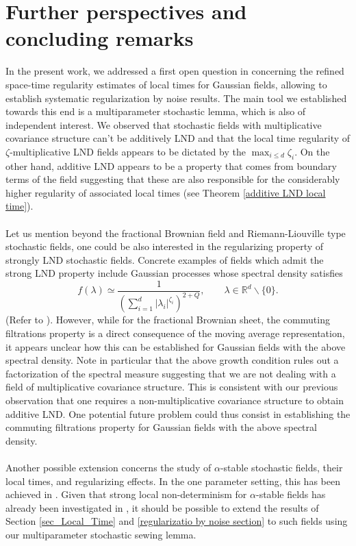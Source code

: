 \documentclass[11pt,oneside,english,reqno]{amsart}
\numberwithin{equation}{section}
\numberwithin{figure}{section}
\theoremstyle{plain}
\theoremstyle{definition}
\theoremstyle{remark}
\theoremstyle{plain}
\theoremstyle{plain}
\theoremstyle{plain}
\theoremstyle{plain}
\theoremstyle{plain}
\newcommand{\RR}{\mathbb{R}}
\begin{document}
\section{Further perspectives and concluding remarks}
 In the present work, we addressed a first open question in \cite{Bechtold2023} concerning the refined space-time regularity estimates of local times for Gaussian fields, allowing to establish systematic regularization by noise results. The main tool we established towards this end is a multiparameter stochastic lemma, which is also of independent interest. We observed that stochastic fields with multiplicative covariance structure can't be additively LND and  that the local time regularity of $\zeta$-multiplicative LND fields appears to be dictated by the $\max_{i\leq d}\zeta_i$. On the other hand, additive LND appears to be a property that comes from boundary terms of the field suggesting that these are also responsible for the considerably higher regularity of associated local times (see Theorem \ref{additive LND local time}). \\
\\
Let us mention beyond the fractional Brownian field and Riemann-Liouville type stochastic fields, one could be also interested in the regularizing property of strongly LND stochastic fields.  Concrete examples of fields which admit the strong LND property include Gaussian processes whose spectral density satisfies
\[
    f(\lambda)\simeq \frac{1}{\left(\sum_{i=1}^d|\lambda_i|^{\zeta_i}\right)^{2+Q}}, \qquad \lambda\in \RR^d\backslash \{0\}.
    \]
(Refer to \cite[Theorem 3.2]{Xiao}). However, while for the fractional Brownian sheet, the commuting filtrations property is a direct consequence of the moving average representation, it appears unclear how this can be established for Gaussian fields with the above spectral density. Note in particular that the above growth condition rules out a factorization of the spectral measure suggesting that we are not dealing with a field of multiplicative covariance structure. This is consistent with our previous observation that one requires a non-multiplicative covariance structure to obtain additive LND. One potential future problem could thus consist in establishing the commuting filtrations property for Gaussian fields with the above spectral density. \\
\\
Another possible extension concerns the study of $\alpha$-stable stochastic fields, their local times, and regularizing effects. In the one parameter setting, this has been achieved in \cite{ling}. Given that strong local non-determinism for $\alpha$-stable fields has already been investigated in \cite{Xiao2011}, it should be possible to extend the results of Section \ref{sec_Local_Time} and \ref{regularizatio by noise section} to such fields using our multiparameter stochastic sewing lemma. \\
\end{document}
